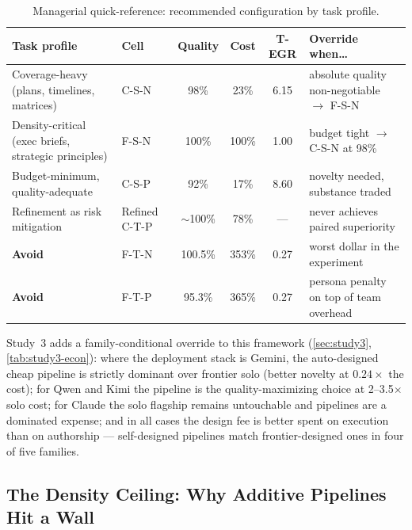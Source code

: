 \documentclass[12pt,a4paper]{article}
\begin{document}
\begin{table}[ht]
  \centering
  \small
  \caption{Managerial quick-reference: recommended configuration by task profile.}
  \label{tab:managerial}
  \begin{tabularx}{\textwidth}{@{}>{\raggedright\arraybackslash}p{3.4cm} l ccc >{\raggedright\arraybackslash}X@{}}
    \toprule
    \textbf{Task profile} & \textbf{Cell} & \textbf{Quality} & \textbf{Cost} & \textbf{T-EGR} & \textbf{Override when\ldots} \\
    \midrule
    Coverage-heavy (plans, timelines, matrices)
      & C-S-N & 98\% & 23\% & 6.15
      & absolute quality non-negotiable $\to$ F-S-N \\
    Density-critical (exec briefs, strategic principles)
      & F-S-N & 100\% & 100\% & 1.00
      & budget tight $\to$ C-S-N at 98\% \\
    Budget-minimum, quality-adequate
      & C-S-P & 92\% & 17\% & 8.60
      & novelty needed, substance traded \\
    Refinement as risk mitigation
      & Refined C-T-P & $\sim$100\% & 78\% & ---
      & never achieves paired superiority \\
    \textbf{Avoid}
      & F-T-N & 100.5\% & 353\% & 0.27
      & worst dollar in the experiment \\
    \textbf{Avoid}
      & F-T-P & 95.3\% & 365\% & 0.27
      & persona penalty on top of team overhead \\
    \bottomrule
  \end{tabularx}
\end{table}

Study~3 adds a family-conditional override to this framework
(\cref{sec:study3}, \cref{tab:study3-econ}): where the deployment stack is
Gemini, the auto-designed cheap pipeline is strictly dominant over frontier
solo (better novelty at $0.24\times$ the cost); for Qwen and Kimi the pipeline
is the quality-maximizing choice at 2--3.5$\times$ solo cost; for Claude the
solo flagship remains untouchable and pipelines are a dominated expense; and in
all cases the design fee is better spent on execution than on authorship ---
self-designed pipelines match frontier-designed ones in four of five families.

\subsection{The Density Ceiling: Why Additive Pipelines Hit a Wall}
\end{document}
